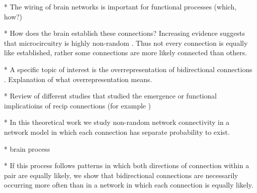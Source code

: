 
* The wiring of brain networks is important for functional processes (which, how?)

* How does the brain establish these connections? Increasing evidence suggests that microcircuitry is highly non-random \cite{Song2005,Perin2011}. Thus not every connection is equally like established, rather some connections are more likely connected than others.

* A specific topic of interest is the overrepresentation of bidirectional connections \cite{Markram1997,Song2005}. Explanation of what overrepresentation means.

* Review of different studies that studied the emergence or functional implicatioins of recip connections (for example \cite{Clopath2010})

* In this theoretical work we study non-random network connectivity in a network model in which each connection has separate probability to exist.

* brain process

* If this process follows patterns in which both directions of connection within a pair are equally likely, we show that bidirectional connections are necessarily occurring more often than in a network in which each connection is equally likely.



